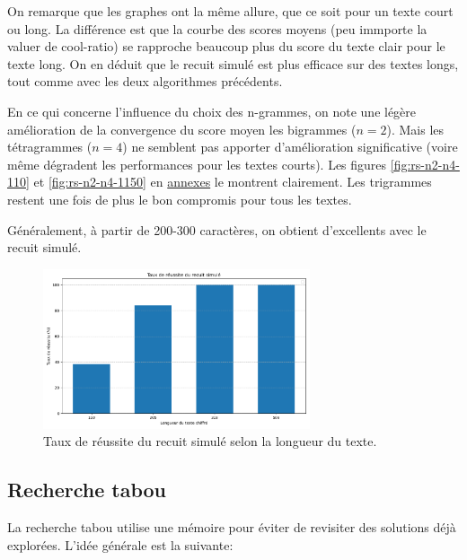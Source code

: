 \documentclass[a4paper]{article}
\begin{document}
On remarque que les graphes ont la même allure, que ce soit pour un texte court ou long. La différence est que la courbe des scores moyens (peu immporte la valuer de cool-ratio) se rapproche beaucoup plus du score du texte clair pour le texte long.
On en déduit que le recuit simulé est plus efficace sur des textes longs, tout comme avec les deux algorithmes précédents.


En ce qui concerne l'influence du choix des n-grammes, on note une légère amélioration de la convergence du score moyen les bigrammes ($n=2$). Mais les tétragrammes ($n=4$) ne semblent pas apporter d'amélioration significative (voire même dégradent les performances pour les textes courts). 
Les figures \ref{fig:rs-n2-n4-110} et \ref{fig:rs-n2-n4-1150} en \hyperref[sec:annexes]{annexes} le montrent clairement. Les trigrammes restent une fois de plus le bon compromis pour tous les textes.

Généralement, à  partir de 200-300 caractères, on obtient d'excellents avec le recuit simulé.

\begin{figure}[H]
    \centering
    \includegraphics[width=0.7\textwidth, keepaspectratio, height=0.6 \textheight]{taux_reussite_rs.png}
    \caption{Taux de réussite du recuit simulé selon la longueur du texte.}
    \label{fig:taux_reussite_optimise}
\end{figure}


\subsection{Recherche tabou}

La recherche tabou utilise une mémoire pour éviter de revisiter des solutions déjà explorées. L'idée générale est la suivante:
\end{document}
